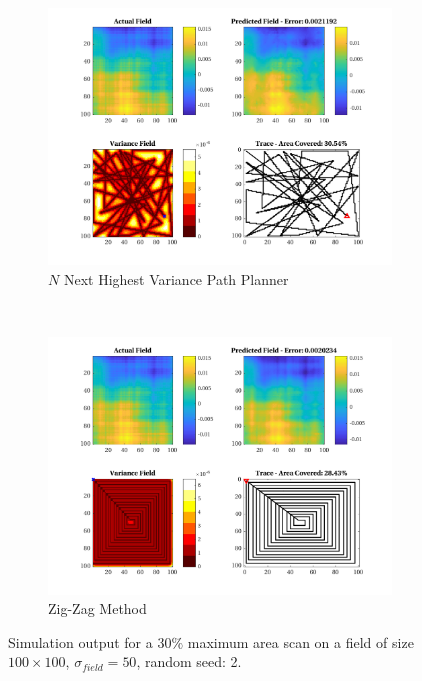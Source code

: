 \begin{figure}[htb!]
\begin{subfigure}[t]{0.5\textwidth}
    \end{subfigure}%
    \\
    \begin{subfigure}[t]{0.5\textwidth}
        \centering
        \includegraphics[width=\linewidth]{figures/hbresults/nnhv_30p_100x100_sf_50_seed_2.png}
        \captionsetup{skip=0.10\baselineskip,size=footnotesize}
        \caption{$N$ Next Highest Variance Path Planner}
    \end{subfigure}%
    ~
    \begin{subfigure}[t]{0.5\textwidth}
        \centering
        \includegraphics[width=\linewidth]{figures/hbresults/zz_30p_100x100_sf_50_seed_2.png}
        \captionsetup{skip=0.10\baselineskip,size=footnotesize}
        \caption{Zig-Zag Method}
    \end{subfigure}%
    \captionsetup{skip=0.20\baselineskip}
    \caption{Simulation output for a $30\%$ maximum area scan on a field of size $100 \times 100$, $\sigma_{field} = 50$, random seed: 2.}
    \label{fig:sim_sigma50_p30_s2}
\end{figure}

